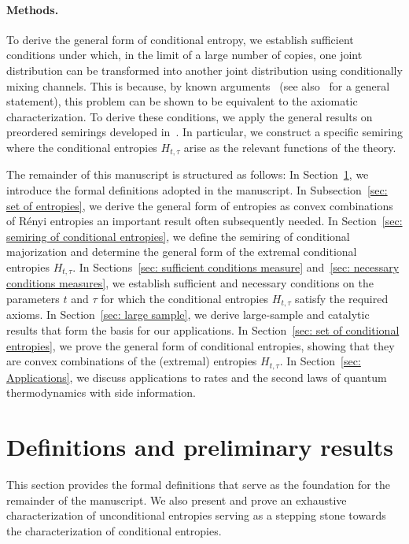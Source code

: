 \documentclass[aps,pra,11pt,onecolumn,nofootinbib,tightenlines]{revtex4-2}
\theoremstyle{definition}
\begin{document}
\paragraph*{Methods.} 
To derive the general form of conditional entropy, we establish sufficient conditions under which, in the limit of a large number of copies, one joint distribution can be transformed into another joint distribution using conditionally mixing channels. This is because, by known arguments~\cite{mu21_renyi} (see also~\cite{haapasalo_inprep} for a general statement), this problem can be shown to be equivalent to the axiomatic characterization.
To derive these conditions, we apply the general results on preordered semirings developed in~\cite{fritz2023abstract,fritz2023abstractII}. 
In particular, we construct a specific semiring where the conditional entropies \( H_{t,\tau} \) arise as the relevant functions of the theory.   

\bigskip

The remainder of this manuscript is structured as follows: In Section~\ref{sec: formal definitions}, we introduce the formal definitions adopted in the manuscript. In Subsection~\ref{sec: set of entropies}, we derive the general form of entropies as convex combinations of R\'enyi entropies an important result often subsequently needed. In Section~\ref{sec: semiring of conditional entropies}, we define the semiring of conditional majorization and determine the general form of the extremal conditional entropies $H_{t,\tau}$. In Sections~\ref{sec: sufficient conditions measure} and~\ref{sec: necessary conditions measures}, we establish sufficient and necessary conditions on the parameters $t$ and $\tau$ for which the conditional entropies $H_{t,\tau}$ satisfy the required axioms. In Section~\ref{sec: large sample}, we derive large-sample and catalytic results that form the basis for our applications. In Section~\ref{sec: set of conditional entropies}, we prove the general form of conditional entropies, showing that they are convex combinations of the (extremal) entropies $H_{t,\tau}$. In Section~\ref{sec: Applications}, we discuss applications to rates and the second laws of quantum thermodynamics with side information.

\section{Definitions and preliminary results}
\label{sec: formal definitions}
This section provides the formal definitions that serve as the foundation for the remainder of the manuscript. We also present and prove an exhaustive characterization of unconditional entropies serving as a stepping stone towards the characterization of conditional entropies.
\end{document}
